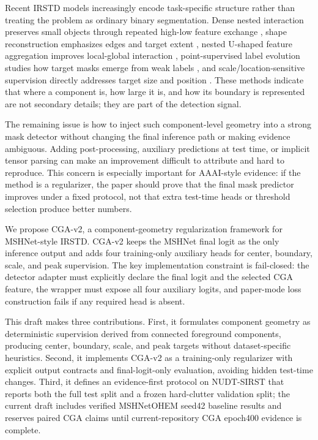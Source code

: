 \documentclass[letterpaper]{article}
\begin{document}
Recent IRSTD models increasingly encode task-specific structure rather than treating the problem as ordinary binary segmentation. Dense nested interaction preserves small objects through repeated high-low feature exchange \citep{li2023dnanet}, shape reconstruction emphasizes edges and target extent \citep{zhang2022isnet}, nested U-shaped feature aggregation improves local-global interaction \citep{wu2023uiunet}, point-supervised label evolution studies how target masks emerge from weak labels \citep{ying2023lesps}, and scale/location-sensitive supervision directly addresses target size and position \citep{liu2024sls}. These methods indicate that where a component is, how large it is, and how its boundary is represented are not secondary details; they are part of the detection signal.

The remaining issue is how to inject such component-level geometry into a strong mask detector without changing the final inference path or making evidence ambiguous. Adding post-processing, auxiliary predictions at test time, or implicit tensor parsing can make an improvement difficult to attribute and hard to reproduce. This concern is especially important for AAAI-style evidence: if the method is a regularizer, the paper should prove that the final mask predictor improves under a fixed protocol, not that extra test-time heads or threshold selection produce better numbers.

We propose CGA-v2, a component-geometry regularization framework for MSHNet-style IRSTD. CGA-v2 keeps the MSHNet final logit as the only inference output and adds four training-only auxiliary heads for center, boundary, scale, and peak supervision. The key implementation constraint is fail-closed: the detector adapter must explicitly declare the final logit and the selected CGA feature, the wrapper must expose all four auxiliary logits, and paper-mode loss construction fails if any required head is absent.

This draft makes three contributions. First, it formulates component geometry as deterministic supervision derived from connected foreground components, producing center, boundary, scale, and peak targets without dataset-specific heuristics. Second, it implements CGA-v2 as a training-only regularizer with explicit output contracts and final-logit-only evaluation, avoiding hidden test-time changes. Third, it defines an evidence-first protocol on NUDT-SIRST that reports both the full test split and a frozen hard-clutter validation split; the current draft includes verified MSHNetOHEM seed42 baseline results and reserves paired CGA claims until current-repository CGA epoch400 evidence is complete.
\end{document}
